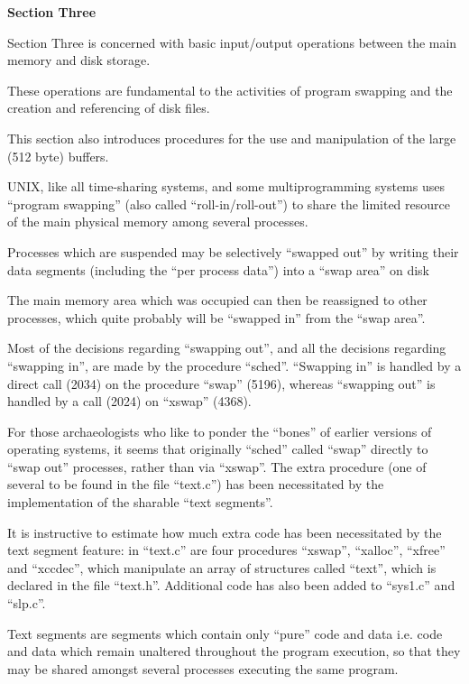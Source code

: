 %
%
{\noindent \Large \bf Section Three}

{\noindent \sf Section Three
is concerned with basic
input/output operations between the
main memory and disk storage.

These operations are fundamental to the
activities of program swapping and the
creation and referencing of disk files.

This section also introduces procedures
for the use and manipulation of the
large (512 byte) buffers.
}


UNIX, like all time-sharing systems,
and some multiprogramming systems uses
``program swapping'' (also called ``roll-in/roll-out'')
 to share the limited
resource of the main physical memory
among several processes.

Processes which are suspended may be
selectively ``swapped out'' by writing
their data segments (including the ``per
process data'') into a ``swap area'' on
disk

The main memory area which was occupied
can then be reassigned to other
processes, which quite probably will be
``swapped in'' from the ``swap area''.

Most of the decisions regarding ``swapping out'', and all the decisions
regarding ``swapping in'', are made by
the procedure ``sched''. ``Swapping in'' is
handled by a direct call (2034) on the
procedure ``swap'' (5196), whereas ``swapping out'' is handled by a call (2024)
on ``xswap'' (4368).

For those archaeologists who like to
ponder the ``bones'' of earlier versions
of operating systems, it seems that
originally ``sched'' called ``swap''
directly to ``swap out'' processes,
rather than via ``xswap''. The extra procedure (one of several to be found in
the file ``text.c'') has been necessitated by the implementation of the
sharable ``text segments''.

It is instructive to estimate how much
extra code has been necessitated by the
text segment feature: in ``text.c'' are
four procedures ``xswap'', ``xalloc'',
``xfree'' and ``xccdec'', which manipulate
an array of structures called ``text'',
which is declared in the file ``text.h''.
Additional code has also been added to
``sys1.c'' and ``slp.c''.



Text segments are segments which contain only ``pure'' code and data i.e.
code and data which remain unaltered
throughout the program execution, so
that they may be shared amongst several
processes executing the same program.

